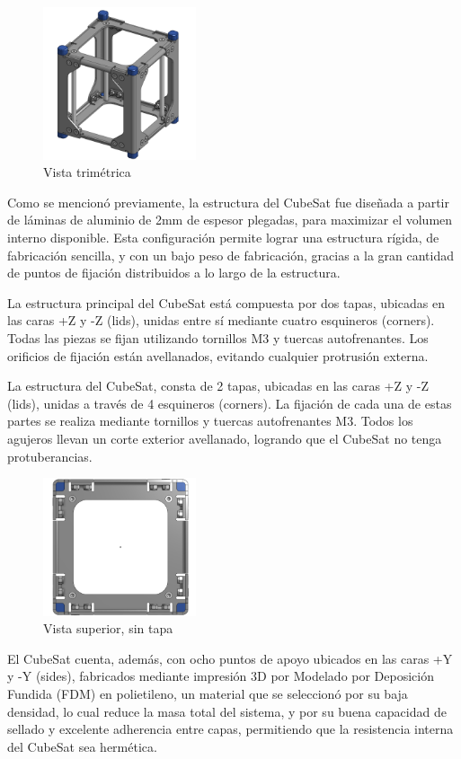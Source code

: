       \begin{figure}
        \centering
        \includegraphics[width=0.4\textwidth]{image/structure/partes.png}
        \caption{Vista trimétrica}
        \label{fig:trimetrica}
      \end{figure}
      Como se mencionó previamente, la estructura del CubeSat fue diseñada a partir de láminas de aluminio
      de 2mm de espesor plegadas, para maximizar el volumen interno disponible. Esta configuración permite
      lograr una estructura rígida, de fabricación sencilla, y con un bajo peso de fabricación, gracias a
      la gran cantidad de puntos de fijación distribuidos a lo largo de la estructura.

      La estructura principal del CubeSat está compuesta por dos tapas, ubicadas en las caras +Z y -Z
      (lids), unidas entre sí mediante cuatro esquineros (corners). Todas las piezas se fijan utilizando
      tornillos M3 y tuercas autofrenantes. Los orificios de fijación están avellanados, evitando cualquier
      protrusión externa.

      La estructura del CubeSat, consta de 2 tapas, ubicadas en las caras +Z y -Z (lids), unidas a través
      de 4 esquineros (corners). La fijación de cada una de estas partes se realiza mediante tornillos y
      tuercas autofrenantes M3. Todos los agujeros llevan un corte exterior avellanado, logrando que el
      CubeSat no tenga protuberancias.

      \begin{figure}
        \centering
        \includegraphics[width=0.4\textwidth]{image/structure/superior.png}
        \caption{Vista superior, sin tapa}
        \label{fig:superior}
      \end{figure}
      El CubeSat cuenta, además, con ocho puntos de apoyo ubicados en las caras +Y y -Y (sides),
      fabricados mediante impresión 3D por Modelado por Deposición Fundida (FDM) en polietileno, un
      material que se seleccionó por su baja densidad, lo cual reduce la masa total del sistema, y por
      su buena capacidad de sellado y excelente adherencia entre capas, permitiendo que la resistencia
      interna del CubeSat sea hermética.

